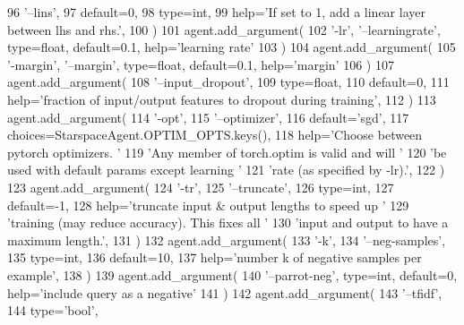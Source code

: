 \begin{DoxyCode}
96             \textcolor{stringliteral}{'--lins'},
97             default=0,
98             type=int,
99             help=\textcolor{stringliteral}{'If set to 1, add a linear layer between lhs and rhs.'},
100         )
101         agent.add\_argument(
102             \textcolor{stringliteral}{'-lr'}, \textcolor{stringliteral}{'--learningrate'}, type=float, default=0.1, help=\textcolor{stringliteral}{'learning rate'}
103         )
104         agent.add\_argument(
105             \textcolor{stringliteral}{'-margin'}, \textcolor{stringliteral}{'--margin'}, type=float, default=0.1, help=\textcolor{stringliteral}{'margin'}
106         )
107         agent.add\_argument(
108             \textcolor{stringliteral}{'--input\_dropout'},
109             type=float,
110             default=0,
111             help=\textcolor{stringliteral}{'fraction of input/output features to dropout during training'},
112         )
113         agent.add\_argument(
114             \textcolor{stringliteral}{'-opt'},
115             \textcolor{stringliteral}{'--optimizer'},
116             default=\textcolor{stringliteral}{'sgd'},
117             choices=StarspaceAgent.OPTIM\_OPTS.keys(),
118             help=\textcolor{stringliteral}{'Choose between pytorch optimizers. '}
119             \textcolor{stringliteral}{'Any member of torch.optim is valid and will '}
120             \textcolor{stringliteral}{'be used with default params except learning '}
121             \textcolor{stringliteral}{'rate (as specified by -lr).'},
122         )
123         agent.add\_argument(
124             \textcolor{stringliteral}{'-tr'},
125             \textcolor{stringliteral}{'--truncate'},
126             type=int,
127             default=-1,
128             help=\textcolor{stringliteral}{'truncate input & output lengths to speed up '}
129             \textcolor{stringliteral}{'training (may reduce accuracy). This fixes all '}
130             \textcolor{stringliteral}{'input and output to have a maximum length.'},
131         )
132         agent.add\_argument(
133             \textcolor{stringliteral}{'-k'},
134             \textcolor{stringliteral}{'--neg-samples'},
135             type=int,
136             default=10,
137             help=\textcolor{stringliteral}{'number k of negative samples per example'},
138         )
139         agent.add\_argument(
140             \textcolor{stringliteral}{'--parrot-neg'}, type=int, default=0, help=\textcolor{stringliteral}{'include query as a negative'}
141         )
142         agent.add\_argument(
143             \textcolor{stringliteral}{'--tfidf'},
144             type=\textcolor{stringliteral}{'bool'},

\end{DoxyCode}
